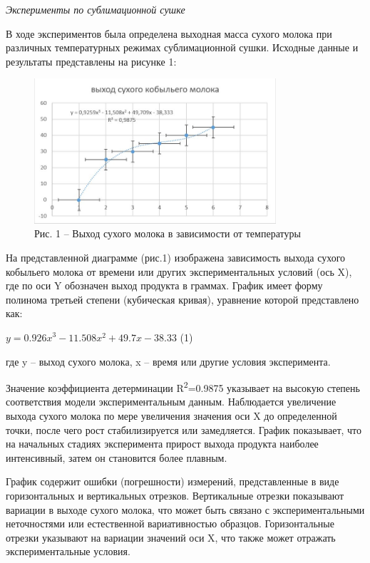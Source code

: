 \emph{Эксперименты по сублимационной сушке}

В ходе экспериментов была определена выходная масса сухого молока при
различных температурных режимах сублимационной сушки. Исходные данные и
результаты представлены на рисунке 1:

\begin{figure}[H]
	\centering
	\includegraphics[width=0.8\textwidth]{assets/309-6}
	\caption*{Рис. 1 -- Выход сухого молока в зависимости от температуры}
\end{figure}



На представленной диаграмме (рис.1) изображена зависимость выхода сухого
кобыльего молока от времени или других экспериментальных условий (ось
X), где по оси Y обозначен выход продукта в граммах. График имеет форму
полинома третьей степени (кубическая кривая), уравнение которой
представлено как:

\(y = {0.926x}^{3} - 11.508x^{2} + 49.7x - 38.33\) (1)

где y -- выход сухого молока, x -- время или другие условия
эксперимента.

Значение коэффициента детерминации R\textsuperscript{2}=0.9875 указывает
на высокую степень соответствия модели экспериментальным данным.
Наблюдается увеличение выхода сухого молока по мере увеличения значения
оси X до определенной точки, после чего рост стабилизируется или
замедляется. График показывает, что на начальных стадиях эксперимента
прирост выхода продукта наиболее интенсивный, затем он становится более
плавным.

График содержит ошибки (погрешности) измерений, представленные в виде
горизонтальных и вертикальных отрезков. Вертикальные отрезки показывают
вариации в выходе сухого молока, что может быть связано с
экспериментальными неточностями или естественной вариативностью
образцов. Горизонтальные отрезки указывают на вариации значений оси X,
что также может отражать экспериментальные условия.

